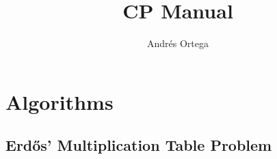 \documentclass[12pt]{article}
\newcommand{\<}{\langle}
\renewcommand{\>}{\rangle}
\renewcommand{\(}{\left(}
\renewcommand{\)}{\right)}
\begin{document}
\title{CP Manual}
\author{Andrés Ortega}
\date{}

\maketitle

\section{Algorithms}
\subsection{Erdős' Multiplication Table Problem}

\end{document}
